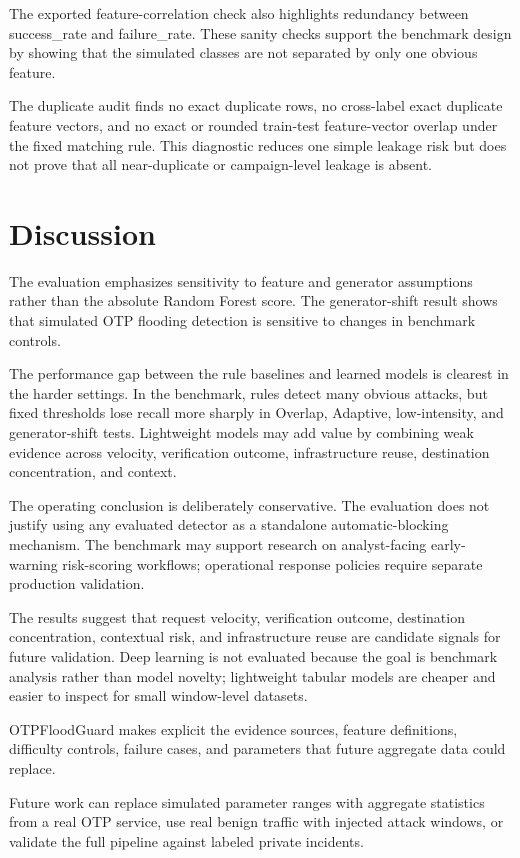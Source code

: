 \documentclass[conference]{IEEEtran}
\begin{document}
The exported feature-correlation check also highlights redundancy between success\_rate and failure\_rate. These sanity checks support the benchmark design by showing that the simulated classes are not separated by only one obvious feature.

The duplicate audit finds no exact duplicate rows, no cross-label exact duplicate feature vectors, and no exact or rounded train-test feature-vector overlap under the fixed matching rule. This diagnostic reduces one simple leakage risk but does not prove that all near-duplicate or campaign-level leakage is absent.

\section{Discussion}

The evaluation emphasizes sensitivity to feature and generator assumptions rather than the absolute Random Forest score. The generator-shift result shows that simulated OTP flooding detection is sensitive to changes in benchmark controls.

The performance gap between the rule baselines and learned models is clearest in the harder settings. In the benchmark, rules detect many obvious attacks, but fixed thresholds lose recall more sharply in Overlap, Adaptive, low-intensity, and generator-shift tests. Lightweight models may add value by combining weak evidence across velocity, verification outcome, infrastructure reuse, destination concentration, and context.

The operating conclusion is deliberately conservative. The evaluation does not justify using any evaluated detector as a standalone automatic-blocking mechanism. The benchmark may support research on analyst-facing early-warning risk-scoring workflows; operational response policies require separate production validation.

The results suggest that request velocity, verification outcome, destination concentration, contextual risk, and infrastructure reuse are candidate signals for future validation. Deep learning is not evaluated because the goal is benchmark analysis rather than model novelty; lightweight tabular models are cheaper and easier to inspect for small window-level datasets.

OTPFloodGuard makes explicit the evidence sources, feature definitions, difficulty controls, failure cases, and parameters that future aggregate data could replace.

Future work can replace simulated parameter ranges with aggregate statistics from a real OTP service, use real benign traffic with injected attack windows, or validate the full pipeline against labeled private incidents.
\end{document}
